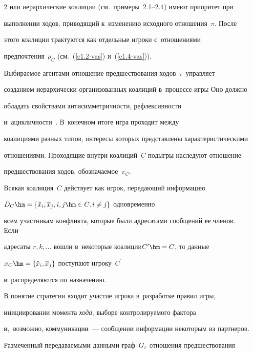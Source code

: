 \begin{multicols}{2}
или иерархические коалиции (см.\ примеры~2.1--2.4) имеют приоритет при 

выполнении ходов, приводящий к~изменению исходного отношения~$\pi$. После 

этого коалиции трактуются как отдельные игроки с~отношениями 

предпочтения~$\rho_C$ (см.~(\ref{e1.2-vas}) и~(\ref{e1.4-vas})). 

    

    Выбираемое агентами отношение предшествования ходов~$\pi$ управ\-ля\-ет 

созданием иерархически организованных коалиций в~процессе игры Оно должно 

обладать свойствами ан\-ти\-сим\-мет\-рич\-ности, реф\-лек\-сив\-ности 

    и~ацик\-лич\-ности~\cite{5-vas}. В~конечном итоге игра проходит между 

коалициями разных типов, интересы которых пред\-став\-ле\-ны характеристическими 

отношениями. Проходящие внут\-ри коалиций~$C$ подыгры наследуют отношение 

предшествования ходов, обозна\-ча\-емое~$\pi_C$.

    

    Всякая коалиция~$C$ действует как игрок, пе\-ре\-да\-ющий информацию 

$D_C\hm= \left\{ \tilde{x}_i, \overline{x}_j, i,j\hm\in C, i\not=j\right\}$ одновременно 

всем участникам конфликта, которые были адресатами сообщений ее членов. Если 

адресаты $r,k,\ldots$ вошли в~некоторые коалиции\linebreak $C^\prime\hm= C$, то данные 

$x_C\hm= \left\{ \tilde{x}_i,\overline{x}_j\right\}$ по\-сту\-па\-ют игроку~$C^\prime$ 

и~распределяются по на\-зна\-че\-нию. 

    

    В понятие стратегии входит участие игрока в~разработке правил игры, 

ини\-ци\-иро\-ва\-нии момента \textit{хода}, выборе конт\-ро\-ли\-ру\-емо\-го фак\-то\-ра 

и,~воз\-мож\-но, коммуникации~--- сообщении информации некоторым из партнеров. 

Размеченный пе\-ре\-да\-ва\-емы\-ми данными граф~$G_\pi$ отношения предшествования 


\end{multicols}
